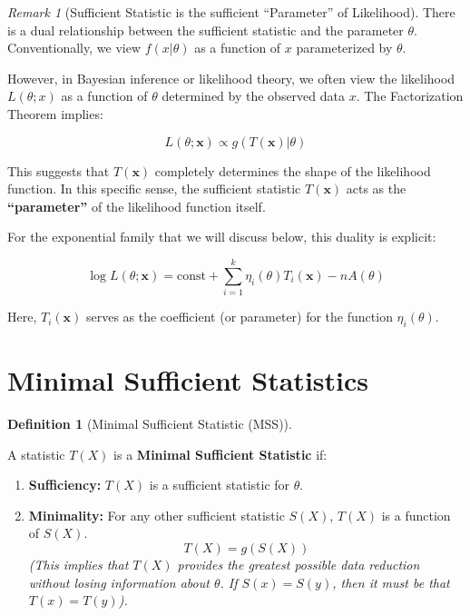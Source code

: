 \documentclass[
  letterpaper,
  DIV=11,
  numbers=noendperiod]{scrreprt}
\providecommand{\tightlist}{%
  \setlength{\itemsep}{0pt}\setlength{\parskip}{0pt}}
\renewcommand{\[}{\begin{equation}}
\renewcommand{\]}{\end{equation}}
\theoremstyle{definition}
\newtheorem{definition}{Definition}[chapter]
\theoremstyle{plain}
\theoremstyle{plain}
\theoremstyle{plain}
\theoremstyle{definition}
\theoremstyle{plain}
\theoremstyle{remark}
\newtheorem{refremark}{Remark}[chapter]
\begin{document}
\begin{refremark}[Sufficient Statistic is the sufficient ``Parameter''
of Likelihood]
There is a dual relationship between the sufficient statistic and the
parameter \(\theta\). Conventionally, we view \(f(x|\theta)\) as a
function of \(x\) parameterized by \(\theta\).

However, in Bayesian inference or likelihood theory, we often view the
likelihood \(L(\theta; x)\) as a function of \(\theta\) determined by
the observed data \(x\). The Factorization Theorem implies:

\[
L(\theta; \mathbf{x}) \propto g(T(\mathbf{x})|\theta)
\]

This suggests that \(T(\mathbf{x})\) completely determines the shape of
the likelihood function. In this specific sense, the sufficient
statistic \(T(\mathbf{x})\) acts as the \textbf{``parameter''} of the
likelihood function itself.

For the exponential family that we will discuss below, this duality is
explicit:

\[
\log L(\theta; \mathbf{x}) = \text{const} + \sum_{i=1}^k \eta_i(\theta) T_i(\mathbf{x}) - n A(\theta)
\]

Here, \(T_i(\mathbf{x})\) serves as the coefficient (or parameter) for
the function \(\eta_i(\theta)\).

\label{rem-sufficient-likelihood}

\end{refremark}

\section{Minimal Sufficient
Statistics}\label{minimal-sufficient-statistics}

\begin{definition}[Minimal Sufficient Statistic
(MSS)]\protect\hypertarget{def-mss}{}\label{def-mss}

A statistic \(T(X)\) is a \textbf{Minimal Sufficient Statistic} if:

\begin{enumerate}
\def\labelenumi{\arabic{enumi}.}
\tightlist
\item
  \textbf{Sufficiency:} \(T(X)\) is a sufficient statistic for
  \(\theta\).
\item
  \textbf{Minimality:} For any other sufficient statistic \(S(X)\),
  \(T(X)\) is a function of \(S(X)\). \[
      T(X) = g(S(X))
      \] \emph{(This implies that \(T(X)\) provides the greatest
  possible data reduction without losing information about \(\theta\).
  If \(S(x) = S(y)\), then it must be that \(T(x) = T(y)\)).}
\end{enumerate}

\end{definition}
\end{document}
